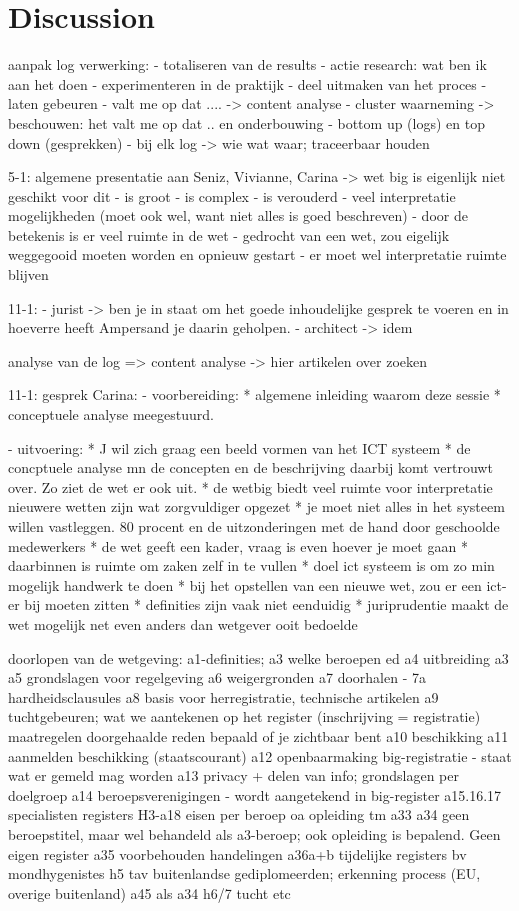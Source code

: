 \newpage
\section{Discussion} \label{Discussion}

aanpak log verwerking:
- totaliseren van de results
- actie research: wat ben ik aan het doen
- experimenteren in de praktijk
- deel uitmaken van het proces
- laten gebeuren
- valt me op dat .... -> content analyse
- cluster waarneming -> beschouwen: het valt me op dat .. en onderbouwing
- bottom up (logs) en top down (gesprekken)
- bij elk log -> wie wat waar; traceerbaar houden


5-1:
algemene presentatie aan Seniz, Vivianne, Carina
-> wet big is eigenlijk niet geschikt voor dit
- is groot
- is complex
- is verouderd
- veel interpretatie mogelijkheden (moet ook wel, want niet alles is goed beschreven)
- door de betekenis is er veel ruimte in de wet
- gedrocht van een wet, zou eigelijk weggegooid moeten worden en opnieuw gestart
- er moet wel interpretatie ruimte blijven


11-1:
- jurist -> ben je in staat om het goede inhoudelijke gesprek te voeren en in hoeverre heeft Ampersand je daarin geholpen.
- architect -> idem

analyse van de log => content analyse -> hier artikelen over zoeken


11-1: gesprek Carina:
- voorbereiding:
* algemene inleiding waarom deze sessie
* conceptuele analyse meegestuurd.

- uitvoering:
* J wil zich graag een beeld vormen van het ICT systeem
* de concptuele analyse mn de concepten en de beschrijving daarbij komt vertrouwt over. Zo ziet de wet er ook uit.
* de wetbig biedt veel ruimte voor interpretatie
    nieuwere wetten zijn wat zorgvuldiger opgezet
* je moet niet alles in het systeem willen vastleggen. 80 procent en de uitzonderingen met de hand door geschoolde medewerkers
* de wet geeft een kader, vraag is even hoever je moet gaan
* daarbinnen is ruimte om zaken zelf in te vullen
* doel ict systeem is om zo min mogelijk handwerk te doen
* bij het opstellen van een nieuwe wet, zou er een ict-er bij moeten zitten
* definities zijn vaak niet eenduidig
* juriprudentie maakt de wet mogelijk net even anders dan wetgever ooit bedoelde

doorlopen van de wetgeving:
a1-definities; 
a3 welke beroepen ed
a4 uitbreiding a3
a5 grondslagen voor regelgeving
a6 weigergronden
a7 doorhalen - 7a hardheidsclausules
a8 basis voor herregistratie, technische artikelen
a9 tuchtgebeuren; wat we aantekenen op het register
(inschrijving = registratie)
maatregelen
doorgehaalde reden bepaald of je zichtbaar bent 
a10 beschikking
a11 aanmelden beschikking (staatscourant)
a12 openbaarmaking big-registratie - staat wat er gemeld mag worden
a13 privacy + delen van info; grondslagen per doelgroep
a14 beroepsverenigingen - wordt aangetekend in big-register
a15.16.17 specialisten registers
H3-a18 eisen per beroep oa opleiding
tm a33
a34 geen beroepstitel, maar wel behandeld als a3-beroep; ook opleiding is bepalend. Geen eigen register
a35 voorbehouden handelingen
a36a+b tijdelijke registers bv mondhygenistes
h5 tav buitenlandse gediplomeerden; erkenning process (EU, overige buitenland)
a45 als a34
h6/7 tucht
etc

